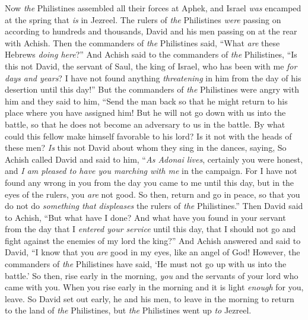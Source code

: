 \begin{biblechapter} %
 Now \textit{the} Philistines assembled all their forces at Aphek, and Israel \textit{was} encamped at the spring that \textit{is} in Jezreel.
\verse The rulers of \textit{the} Philistines \textit{were} passing on according to hundreds and thousands, David and his men passing on at the rear with Achish.
\verse Then the commanders of \textit{the} Philistines said, “What \textit{are} these Hebrews \textit{doing here}?” And Achish said to the commanders of \textit{the} Philistines, “Is this not David, the servant of Saul, the king of Israel, who has been with me \textit{for days and years}? I have not found anything \textit{threatening} in him from the day of his desertion until this day!”
\verse But the commanders of \textit{the} Philistines were angry with him and they said to him, “Send the man back so that he might return to his place where you have assigned him! But he will not go down with us into the battle, so that he does not become an adversary to us in the battle. By what could this fellow make himself favorable to his lord? Is it not with the heads of these men?
\verse \textit{Is} this not David about whom they sing in the dances, saying,
\verse So Achish called David and said to him, “\textit{As Adonai lives}, certainly you were honest, and \textit{I am pleased to have you marching with me} in the campaign. For I have not found any wrong in you from the day you came to me until this day, but in the eyes of the rulers, you \textit{are} not good.
\verse So then, return and go in peace, so that you do not do \textit{something that displeases} the rulers of \textit{the} Philistines.”
\verse Then David said to Achish, “But what have I done? And what have you found in your servant from the day that I \textit{entered your service} until this day, that I should not go and fight against the enemies of my lord the king?”
\verse And Achish answered and said to David, “I know that you \textit{are} good in my eyes, like an angel of God! However, the commanders of \textit{the} Philistines have said, ‘He must not go up with us into the battle.’
\verse So then, rise early in the morning, \textit{you} and the servants of your lord who came with you. When you rise early in the morning and it is light \textit{enough} for you, leave.
\verse So David set out early, he and his men, to leave in the morning to return to the land of \textit{the} Philistines, but \textit{the} Philistines went up \textit{to} Jezreel.
\end{biblechapter}

